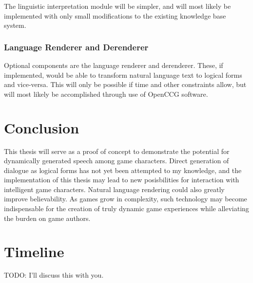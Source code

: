 \documentclass{article}
\begin{document}
The linguistic interpretation module will be simpler, and will most likely be
implemented with only small modifications to the existing knowledge base system.

\subsubsection{Language Renderer and Derenderer}

Optional components are the language renderer and derenderer.  These, if implemented,
would be able to transform natural language text to logical forms and vice-versa.
This will only be possible if time and other constraints allow, but will most likely
be accomplished through use of OpenCCG\cite{White2011} software.

\section{Conclusion}

This thesis will serve as a proof of concept to demonstrate the potential for dynamically
generated speech among game characters.  Direct generation of dialogue as logical forms
has not yet been attempted to my knowledge, and the implementation of this thesis may
lead to new posisbilities for interaction with intelligent game characters.  Natural language
rendering could also greatly improve believability.  As games grow in complexity, such
technology may become indispensable for the creation of truly dynamic game experiences
while alleviating the burden on game authors.

\section{Timeline}

TODO: I'll discuss this with you.


{}
\end{document}
